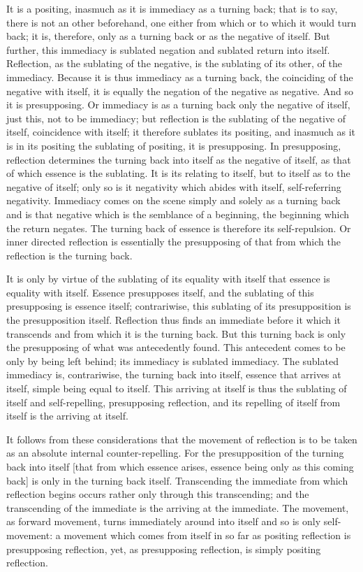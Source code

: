 It is a positing, inasmuch as it is immediacy as a turning back;
that is to say, there is not an other beforehand,
one either from which or to which it would turn back;
it is, therefore, only as a turning back
or as the negative of itself.
But further, this immediacy is sublated negation
and sublated return into itself.
Reflection, as the sublating of the negative, is
the sublating of its other, of the immediacy.
Because it is thus immediacy as a turning back,
the coinciding of the negative with itself,
it is equally the negation of the negative as negative.
And so it is presupposing.
Or immediacy is as a turning back only the negative of itself,
just this, not to be immediacy;
but reflection is the sublating of the negative of itself,
coincidence with itself;
it therefore sublates its positing,
and inasmuch as it is in its positing
the sublating of positing, it is presupposing.
In presupposing, reflection determines the turning back
into itself as the negative of itself,
as that of which essence is the sublating.
It is its relating to itself,
but to itself as to the negative of itself;
only so is it negativity which abides with itself,
self-referring negativity.
Immediacy comes on the scene simply and solely
as a turning back and is that negative
which is the semblance of a beginning,
the beginning which the return negates.
The turning back of essence is therefore its self-repulsion.
Or inner directed reflection is essentially
the presupposing of that from which
the reflection is the turning back.

It is only by virtue of the sublating of its equality with itself
that essence is equality with itself.
Essence presupposes itself, and the sublating of
this presupposing is essence itself;
contrariwise, this sublating of its presupposition is
the presupposition itself.
Reflection thus finds an immediate before it
which it transcends and from which it is the turning back.
But this turning back is only the presupposing of
what was antecedently found.
This antecedent comes to be only by being left behind;
its immediacy is sublated immediacy.
The sublated immediacy is, contrariwise, the turning
back into itself,
essence that arrives at itself, simple being equal to itself.
This arriving at itself is thus the sublating of itself
and self-repelling, presupposing reflection,
and its repelling of itself from itself is
the arriving at itself.

It follows from these considerations that
the movement of reflection is to be taken as
an absolute internal counter-repelling.
For the presupposition of
the turning back into itself
[that from which essence arises,
essence being only as this coming back]
is only in the turning back itself.
Transcending the immediate from which reflection begins
occurs rather only through this transcending;
and the transcending of the immediate is
the arriving at the immediate.
The movement, as forward movement, turns immediately
around into itself and so is only self-movement:
a movement which comes from itself in so far as
positing reflection is presupposing reflection, yet,
as presupposing reflection, is simply positing reflection.

